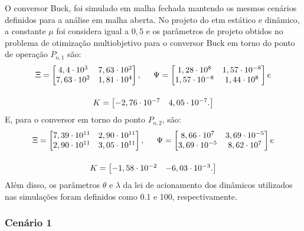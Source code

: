 O conversor Buck, foi simulado em malha fechada mantendo os mesmos cenários definidos para a análise em malha aberta. No projeto do \acrshort{etm} estático e dinâmico, a constante $\mu$ foi considera igual a $0,5$ e os parâmetros de projeto obtidos no problema de otimização multiobjetivo para o conversor Buck em torno do ponto de operação $P_{\mathrm{o}, 1}$ são: \begin{gather}
  \Xi = \begin{bmatrix}
    4,4 \cdot 10^3  & 7,63 \cdot 10^2 \\
    7,63 \cdot 10^2 & 1,81 \cdot 10^4 \\
  \end{bmatrix}, \hspace{.5cm}
  \Psi = \begin{bmatrix}
    1,28 \cdot 10^8    & 1,57 \cdot 10^{-8} \\
    1,57 \cdot 10^{-8} & 1,44 \cdot 10^8    \\
  \end{bmatrix} e \notag \\[12pt]
  K = \begin{bmatrix}
    -2,76 \cdot 10^{-7} & 4,05 \cdot 10^{-7}. \notag
  \end{bmatrix}
\end{gather} E, para o conversor em torno do ponto $P_{\mathrm{o}, 2}$, são: \begin{gather}
  \Xi = \begin{bmatrix}
    7,39 \cdot 10^{11} & 2,90 \cdot 10^{11} \\
    2,90 \cdot 10^{11} & 3,05 \cdot 10^{11} \\
  \end{bmatrix}, \hspace{.5cm}
  \Psi = \begin{bmatrix}
    8,66 \cdot 10^7    & 3,69 \cdot 10^{-5} \\
    3,69 \cdot 10^{-5} & 8,62 \cdot 10^7    \\
  \end{bmatrix} e \notag \\[12pt]
  K = \begin{bmatrix}
    -1,58 \cdot 10^{-2} & -6,03 \cdot 10^{-3}. \notag
  \end{bmatrix}
\end{gather} Além disso, os parâmetros $\theta$ e $\lambda$ da lei de acionamento dos  dinâmicos utilizados nas simulações foram definidos como 0.1 e 100, respectivamente.

\subsubsection{Cenário 1}

